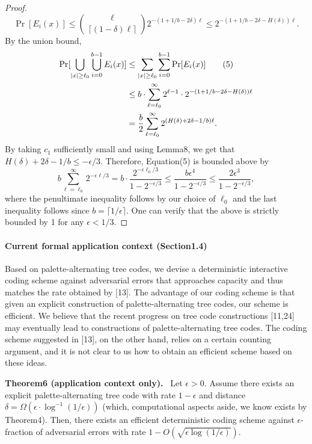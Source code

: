 \documentclass[10pt,a4paper]{article}
\newenvironment{authorclaim}[1]{\par\medskip\noindent\textbf{#1.}\ \ignorespaces}{\par\medskip}
\begin{document}
\begin{proof}
\[
\Pr[E_i(x)]\le\binom\ell{\lceil(1-\delta)\ell\rceil}2^{-(1+1/b-2\delta)\ell}
\le2^{-(1+1/b-2\delta-H(\delta))\ell}.
\]
By the union bound,
\begin{align}
\Pr[\bigcup_{|x|\ge\ell_0}\bigcup_{i=0}^{b-1}E_i(x)]
&\le\sum_{|x|\ge\ell_0}\sum_{i=0}^{b-1}\Pr[E_i(x)]\tag{5}\\
&\le b\cdot\sum_{\ell=\ell_0}^\infty2^{\ell-1}\cdot2^{-(1+1/b-2\delta-H(\delta))\ell}\notag\\
&=\frac b2\sum_{\ell=\ell_0}^\infty2^{(H(\delta)+2\delta-1/b)\ell}.\notag
\end{align}
By taking $c_1$ sufficiently small and using Lemma8, we get that $H(\delta)+2\delta-1/b\le-\epsilon/3$. Therefore, Equation(5) is bounded above by
\[
b\sum_{\ell=\ell_0}^\infty2^{-\epsilon\ell/3}
=b\cdot\frac{2^{-\epsilon\ell_0/3}}{1-2^{-\epsilon/3}}
\le\frac{b\epsilon^4}{1-2^{-\epsilon/3}}
\le\frac{2\epsilon^3}{1-2^{-\epsilon/3}},
\]
where the penultimate inequality follows by our choice of $\ell_0$ and the last inequality follows since $b=\lceil1/\epsilon\rceil$. One can verify that the above is strictly bounded by 1 for any $\epsilon<1/3$.
\end{proof}

\paragraph{Current formal application context (Section1.4)}
Based on palette-alternating tree codes, we devise a deterministic interactive coding scheme against adversarial errors that approaches capacity and thus matches the rate obtained by [13]. The advantage of our coding scheme is that given an explicit construction of palette-alternating tree codes, our scheme is efficient. We believe that the recent progress on tree code constructions [11,24] may eventually lead to constructions of palette-alternating tree codes. The coding scheme suggested in [13], on the other hand, relies on a certain counting argument, and it is not clear to us how to obtain an efficient scheme based on these ideas.
\begin{authorclaim}{Theorem6 (application context only)}
Let $\epsilon>0$. Assume there exists an explicit palette-alternating tree code with rate $1-\epsilon$ and distance $\delta=\Omega(\epsilon\cdot\log^{-1}(1/\epsilon))$ (which, computational aspects aside, we know exists by Theorem4). Then, there exists an efficient deterministic coding scheme against $\epsilon$-fraction of adversarial errors with rate $1-O(\sqrt{\epsilon\log(1/\epsilon)})$.
\end{authorclaim}
\end{document}
